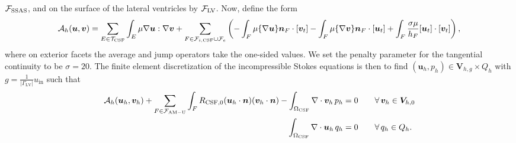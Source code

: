\documentclass[fleqn,10pt]{wlscirep}
\begin{document}
$\mathcal{F}_{\rm SSAS}$, and on the surface of the lateral ventricles by $\mathcal{F}_{\rm LV}$. Now, define the form 
\begin{multline}
  \mathcal{A}_h(\bm u, \bm v)
  = \sum_{E \in \mathcal{T}_{\rm CSF}} \int_{E} \mu \nabla \bm u : \nabla \bm v
 + \sum_{F \in \mathcal{F}_{i, \rm CSF} \cup \mathcal{F}_{e}} \left (
  -\int_{F} \mu \{\nabla \bm u\}  \bm n_F \cdot [\bm v_t] 
  - %
  \int_{F} \mu \{\nabla \bm v\}  \bm n_F \cdot [\bm u_t]
  + %
\int_{F}   \frac{\sigma \mu}{h_F} [\bm u_t ] \cdot [\bm v_t] \right ),   
\end{multline}
where on exterior facets the average and jump operators take the one-sided values. We set the penalty parameter for the tangential continuity to be $\sigma = 20$. The finite element discretization of the incompressible Stokes equations is then to find $(\bm u_h, p_h) \in \bm V_{h,g} \times Q_h$ with $g  = \frac{1}{|\Gamma_{\mathrm{LV}}|} u_{\mathrm{in}}$  such that 
\begin{subequations}
\begin{align}
  \mathcal{A}_h(\bm u_h, \bm v_h)
  + \sum_{F \in \mathcal{F}_{\rm AM-U}} \int_{F} R_{\rm CSF, 0} (\bm u_h \cdot \bm n) (\bm v_h \cdot \bm n)
  - \int_{\Omega_{\rm CSF}} \nabla \cdot \bm v_h \, p_h  &= 0 \qquad \forall \, \bm v_h \in \bm V_{h,0} \\ 
\int_{\Omega_{\rm CSF}} \nabla \cdot \bm u_h \, q_h  &= 0 \qquad \forall \, q_h \in Q_h.
\end{align}
\end{subequations}


\end{document}
